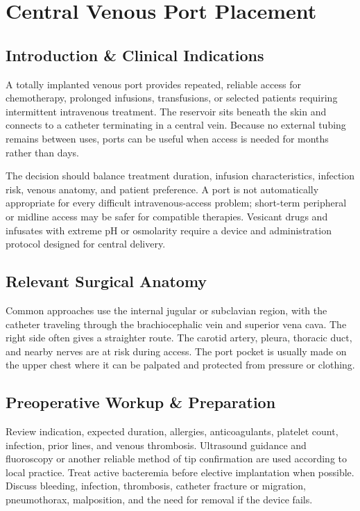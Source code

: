 \chapter{Central Venous Port Placement}

\section*{Introduction \& Clinical Indications}
A totally implanted venous port provides repeated, reliable access for chemotherapy, prolonged infusions, transfusions, or selected patients requiring intermittent intravenous treatment. The reservoir sits beneath the skin and connects to a catheter terminating in a central vein. Because no external tubing remains between uses, ports can be useful when access is needed for months rather than days.

The decision should balance treatment duration, infusion characteristics, infection risk, venous anatomy, and patient preference. A port is not automatically appropriate for every difficult intravenous-access problem; short-term peripheral or midline access may be safer for compatible therapies. Vesicant drugs and infusates with extreme pH or osmolarity require a device and administration protocol designed for central delivery.

\section*{Relevant Surgical Anatomy}
Common approaches use the internal jugular or subclavian region, with the catheter traveling through the brachiocephalic vein and superior vena cava. The right side often gives a straighter route. The carotid artery, pleura, thoracic duct, and nearby nerves are at risk during access. The port pocket is usually made on the upper chest where it can be palpated and protected from pressure or clothing.

\section*{Preoperative Workup \& Preparation}
Review indication, expected duration, allergies, anticoagulants, platelet count, infection, prior lines, and venous thrombosis. Ultrasound guidance and fluoroscopy or another reliable method of tip confirmation are used according to local practice. Treat active bacteremia before elective implantation when possible. Discuss bleeding, infection, thrombosis, catheter fracture or migration, pneumothorax, malposition, and the need for removal if the device fails.

